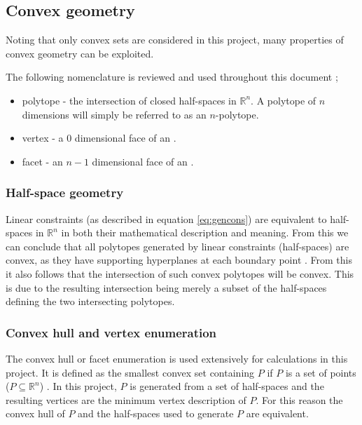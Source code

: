 \subsection{Convex geometry}
Noting that only convex sets are considered in this project, many properties of convex geometry can be exploited.

The following nomenclature is reviewed and used throughout this document \citep[487]{bayerlee};
\begin{itemize}
\item polytope - the intersection of closed half-spaces in $\mathbb{R}^n$.
A polytope of $n$ dimensions will simply be referred to as an $n$-polytope.
\item vertex - a 0 dimensional face of an \npoly.
\item facet - an $n-1$ dimensional face of an \npoly.
\end{itemize}

\subsubsection{Half-space geometry}
Linear constraints (as described in equation \ref{eq:gencons}) are equivalent to half-spaces in $\mathbb{R}^n$ in both their mathematical description and meaning.
From this we can conclude that all polytopes generated by linear constraints (half-spaces) are convex, as they have supporting hyperplanes at each boundary point \citep[21]{manilev}.
From this it also follows that the intersection of such convex polytopes will be convex.
This is due to the resulting intersection being merely a subset of the half-spaces defining the two intersecting polytopes.

\subsubsection{Convex hull and vertex enumeration}
The convex hull or facet enumeration is used extensively for calculations in this project.
It is defined as the smallest convex set containing $P$ if $P$ is a set of points ($P \subseteq \mathbb{R}^n$) \citep[74]{wenger}.
In this project, $P$ is generated from a set of half-spaces and the resulting vertices are the minimum vertex description of $P$.
For this reason the convex hull of $P$ and the half-spaces used to generate $P$ are equivalent.

